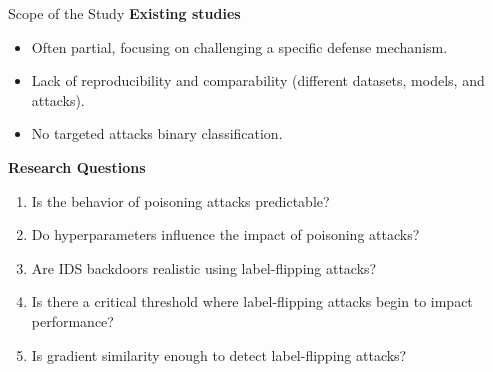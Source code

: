 \begin{frame}{Scope of the Study}
  \textbf{Existing studies}
  \begin{itemize}
    \item Often partial, focusing on challenging a specific defense mechanism.
    \item Lack of reproducibility and comparability (different datasets, models, and attacks).
    \item No targeted attacks binary classification.
  \end{itemize}

  \pause
  \textbf{Research Questions}
  \begin{enumerate}
    \item Is the behavior of poisoning attacks predictable?
    \item Do hyperparameters influence the impact of poisoning attacks?
    \item Are IDS backdoors realistic using label-flipping attacks?
    \item Is there a critical threshold where label-flipping attacks begin to impact performance?
    \item \alert<3>{Is gradient similarity enough to detect label-flipping attacks?}
  \end{enumerate}
\end{frame}




    

